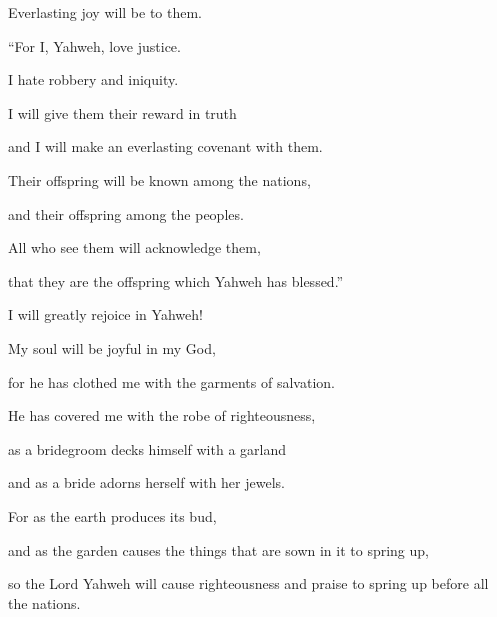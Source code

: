 {\par }{\QB Everlasting joy will be to them.
\par }{\Q {}“For I, Yahweh, love justice.
\par }{\QB I hate robbery and iniquity.
\par }{\Q I will give them their reward in truth
\par }{\QB and I will make an everlasting covenant with them.
\par }{\Q {}Their offspring will be known among the nations,
\par }{\QB and their offspring among the peoples.
\par }{\Q All who see them will acknowledge them,
\par }{\QB that they are the offspring which Yahweh has blessed.”
\par }{\BB \par }{\Q {}I will greatly rejoice in Yahweh!
\par }{\QB My soul will be joyful in my God,
\par }{\Q for he has clothed me with the garments of salvation.
\par }{\QB He has covered me with the robe of righteousness,
\par }{\QB as a bridegroom decks himself with a garland
\par }{\QB and as a bride adorns herself with her jewels.
\par }{\Q {}For as the earth produces its bud,
\par }{\QB and as the garden causes the things that are sown in it to spring up,
\par }{\QB so the Lord Yahweh will cause righteousness and praise to spring up before all the nations.

}
